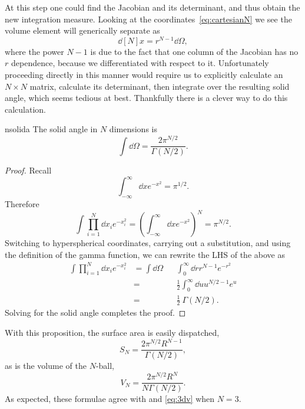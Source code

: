 At this step one could find the Jacobian and its determinant, and thus obtain
the new integration measure. Looking at the coordinates~\eqref{eq:cartesianN}
we see the volume element will generically separate as
\begin{equation}
  \dd[N]{x}=r^{N-1}\dd{\Omega},
\end{equation}
where the power $N-1$ is due to the fact that one column of the Jacobian has no
$r$ dependence, because we differentiated with respect to it. Unfortunately
proceeding directly in this manner would require us to explicitly calculate an
$N\times N$ matrix, calculate its determinant, then integrate over the
resulting solid angle, which seems tedious at best.
Thankfully there is a clever way to do this calculation. 

\begin{proposition}{}{nsolida}
The solid angle in $N$ dimensions is
$$
  \int\dd{\Omega}=\frac{2\pi^{N/2}}{\Gamma(N/2)}.
$$
\begin{proof}
  Recall 
  $$
    \int_{-\infty}^\infty\dd{x}e^{-x^2}=\pi^{1/2}.
  $$
  Therefore
  $$ 
    \int\prod_{i=1}^N\dd{x_i}e^{-x_i^2} 
      =\left(\int_{-\infty}^\infty\dd{x}e^{-x^2}\right)^N=\pi^{N/2}.
  $$
  Switching to hyperspherical coordinates, carrying out
  a substitution, and using the definition of the gamma function,
  we can rewrite the LHS of the above as
  \begin{equation*}\begin{aligned}
    \int\prod_{i=1}^N\dd{x_i}e^{-x_i^2}
       &=\int\dd{\Omega}&&\int_0^\infty\dd{r}r^{N-1}e^{-r^2}\\
       &=&&\frac{1}{2}\int_0^\infty\dd{u}u^{N/2-1}e^u\\
       &=&&\frac{1}{2}~\Gamma(N/2).
  \end{aligned}\end{equation*}
  Solving for the solid angle completes the proof. 
\end{proof}
\end{proposition}
With this proposition, the surface area is easily dispatched,
\begin{equation}
  S_N=\frac{2\pi^{N/2}R^{N-1}}{\Gamma(N/2)},
\end{equation}
as is the volume of the $N$-ball,
\begin{equation}
  V_N=\frac{2\pi^{N/2}R^N}{N\Gamma(N/2)}.
\end{equation}
As expected, these formulae agree with 
and \eqref{eq:3dv} when $N=3$.

